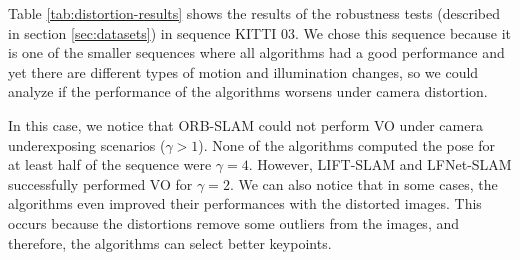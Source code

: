 \documentclass[a4paper, 10pt, conference]{ieeeconf}      %
\begin{document}
Table \ref{tab:distortion-results} shows the results of the robustness tests (described in section \ref{sec:datasets}) in sequence KITTI $03$. We chose this sequence because it is one of the smaller sequences where all algorithms had a good performance and yet there are different types of motion and illumination changes, so we could analyze if the performance of the algorithms worsens under camera distortion.

In this case, we notice that ORB-SLAM could not perform VO under camera underexposing scenarios ($\gamma > 1$). None of the algorithms computed the pose for at least half of the sequence were $\gamma=4$. However, LIFT-SLAM and LFNet-SLAM successfully performed VO for $\gamma = 2$. We can also notice that in some cases, the algorithms even improved their performances with the distorted images. This occurs because the distortions remove some outliers from the images, and therefore, the algorithms can select better keypoints.

\begin{table*}[t]
\centering
\caption[]{Quantitative results of the robustness tests in KITTI $03$. We fill with "X" the sequences unavailable due to tracking failure.}
\label{tab:distortion-results}
\end{table*}
\end{document}
